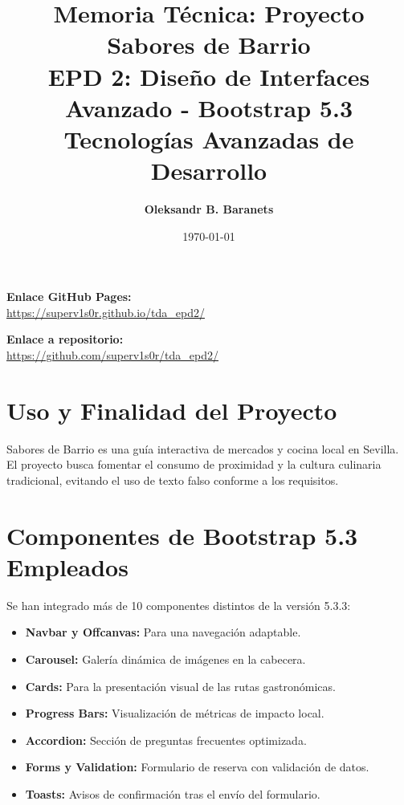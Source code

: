 \documentclass[12pt,a4paper]{article}
\title{
    \vspace{2cm}
    \textbf{Memoria Técnica: Proyecto Sabores de Barrio}\\
    \large EPD 2: Diseño de Interfaces Avanzado - Bootstrap 5.3\\
    \vspace{0.5cm}
    \normalsize Tecnologías Avanzadas de Desarrollo
}
\author{\textbf{Oleksandr B. Baranets}}
\date{\today}
\begin{document}
\maketitle

\begin{center}
    \vspace{1cm}
    \textbf{Enlace GitHub Pages:} \\
    \url{https://superv1s0r.github.io/tda_epd2/}
    \vspace{1cm}
    
    \textbf{Enlace a repositorio:} \\
    \url{https://github.com/superv1s0r/tda_epd2/}
\end{center}

\newpage
\tableofcontents 
\newpage

\section{Uso y Finalidad del Proyecto}
Sabores de Barrio es una guía interactiva de mercados y cocina local en Sevilla. El proyecto busca fomentar el consumo de proximidad y la cultura culinaria tradicional, evitando el uso de texto falso conforme a los requisitos.

\section{Componentes de Bootstrap 5.3 Empleados}
Se han integrado más de 10 componentes distintos de la versión 5.3.3:
\begin{itemize}
    \item \textbf{Navbar y Offcanvas:} Para una navegación adaptable.
    \item \textbf{Carousel:} Galería dinámica de imágenes en la cabecera.
    \item \textbf{Cards:} Para la presentación visual de las rutas gastronómicas.
    \item \textbf{Progress Bars:} Visualización de métricas de impacto local.
    \item \textbf{Accordion:} Sección de preguntas frecuentes optimizada.
    \item \textbf{Forms y Validation:} Formulario de reserva con validación de datos.
    \item \textbf{Toasts:} Avisos de confirmación tras el envío del formulario.
\end{itemize}
\end{document}
